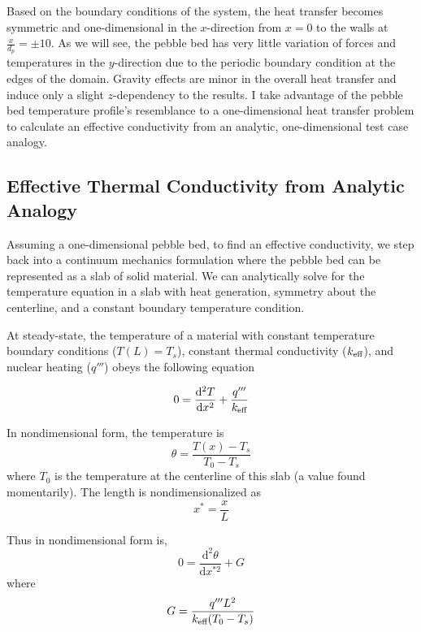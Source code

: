 Based on the boundary conditions of the system, the heat transfer becomes symmetric and one-dimensional in the $x$-direction from $x=0$ to the walls at $\frac{x}{d_p} = \pm 10$. As we will see, the pebble bed has very little variation of forces and temperatures in the $y$-direction due to the periodic boundary condition at the edges of the domain. Gravity effects are minor in the overall heat transfer and induce only a slight $z$-dependency to the results. I take advantage of the pebble bed temperature profile's resemblance to a one-dimensional heat transfer problem to calculate an effective conductivity from an analytic, one-dimensional test case analogy.





\subsection{Effective Thermal Conductivity from Analytic Analogy}\label{sec:keff-analogy}
Assuming a one-dimensional pebble bed, to find an effective conductivity, we step back into a continuum mechanics formulation where the pebble bed can be represented as a slab of solid material. We can analytically solve for the temperature equation in a slab with heat generation, symmetry about the centerline, and a constant boundary temperature condition.

At steady-state, the temperature of a material with constant temperature boundary conditions ($T(L) = T_s$), constant thermal conductivity ($k_\text{eff}$), and nuclear heating ($q'''$) obeys the following equation

\begin{equation}\label{eq:continuum-heateqn}
    0 = \frac{\mathrm{d}^2T}{\mathrm{d}x^2} + \frac{q'''}{k_\text{eff}}
\end{equation}

In nondimensional form, the temperature is
\begin{equation}
    \theta = \frac{T(x) - T_s}{T_0 - T_s}
\end{equation}
where $T_0$ is the temperature at the centerline of this slab (a value found momentarily). The length is nondimensionalized as
\begin{equation}
    x^* = \frac{x}{L}
\end{equation}

Thus  in nondimensional form is,
\begin{equation}\label{eq:continuum-heateqn-nondim}
    0 = \frac{\mathrm{d}^2\theta}{\mathrm{d}x^{*2}} + G
\end{equation}
where
\begin{equation}
    G = \frac{q'''L^2}{k_\text{eff}(T_0 - T_s)}
\end{equation}

